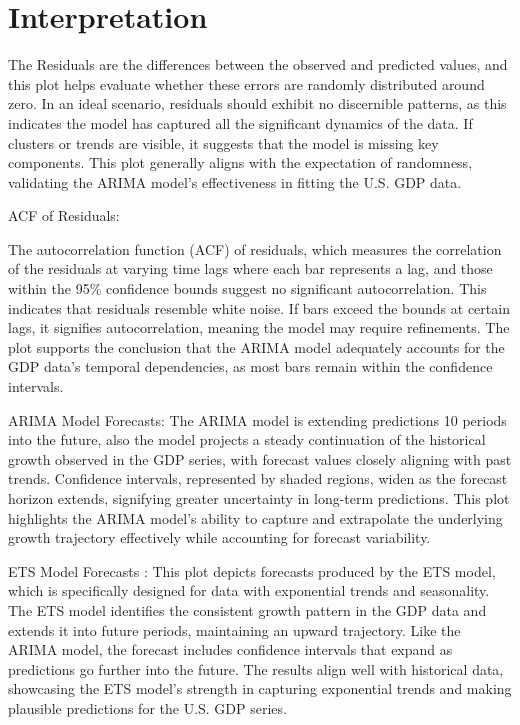 \documentclass[
]{article}
\begin{document}
\section{Interpretation}\label{interpretation}

The Residuals are the differences between the observed and predicted
values, and this plot helps evaluate whether these errors are randomly
distributed around zero. In an ideal scenario, residuals should exhibit
no discernible patterns, as this indicates the model has captured all
the significant dynamics of the data. If clusters or trends are visible,
it suggests that the model is missing key components. This plot
generally aligns with the expectation of randomness, validating the
ARIMA model's effectiveness in fitting the U.S. GDP data.

ACF of Residuals:

The autocorrelation function (ACF) of residuals, which measures the
correlation of the residuals at varying time lags where each bar
represents a lag, and those within the 95\% confidence bounds suggest no
significant autocorrelation. This indicates that residuals resemble
white noise. If bars exceed the bounds at certain lags, it signifies
autocorrelation, meaning the model may require refinements. The plot
supports the conclusion that the ARIMA model adequately accounts for the
GDP data's temporal dependencies, as most bars remain within the
confidence intervals.

ARIMA Model Forecasts: The ARIMA model is extending predictions 10
periods into the future, also the model projects a steady continuation
of the historical growth observed in the GDP series, with forecast
values closely aligning with past trends. Confidence intervals,
represented by shaded regions, widen as the forecast horizon extends,
signifying greater uncertainty in long-term predictions. This plot
highlights the ARIMA model's ability to capture and extrapolate the
underlying growth trajectory effectively while accounting for forecast
variability.

ETS Model Forecasts : This plot depicts forecasts produced by the ETS
model, which is specifically designed for data with exponential trends
and seasonality. The ETS model identifies the consistent growth pattern
in the GDP data and extends it into future periods, maintaining an
upward trajectory. Like the ARIMA model, the forecast includes
confidence intervals that expand as predictions go further into the
future. The results align well with historical data, showcasing the ETS
model's strength in capturing exponential trends and making plausible
predictions for the U.S. GDP series.
\end{document}
